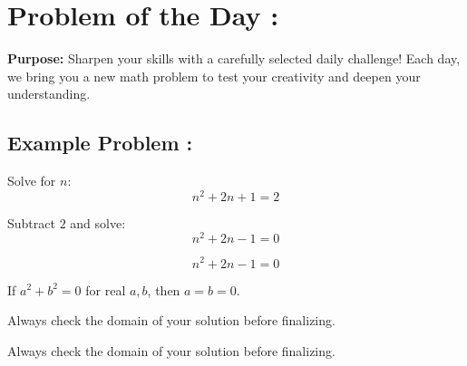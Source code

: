\documentclass[12pt,a4paper]{article}
\begin{document}
\section*{Problem of the Day :}

\textbf{Purpose:} Sharpen your skills with a carefully selected daily challenge!  
Each day, we bring you a new math problem to test your creativity and deepen your understanding.

\subsection*{Example Problem :}
Solve for $n$:
\[
n^2 + 2n + 1 = 2
\]

\begin{walkthrough}
Subtract $2$ and solve:
\[
n^2 + 2n - 1 = 0
\]
\end{walkthrough}

\begin{walkthrough}

\[
n^2 + 2n - 1 = 0
\]
\end{walkthrough}

\begin{theorem}
If $a^2+b^2=0$ for real $a,b$, then $a=b=0$.
\end{theorem}

\begin{lemma}
Always check the domain of your solution before finalizing.
\end{lemma}

\begin{warning}
Always check the domain of your solution before finalizing.
\end{warning}
\end{document}
